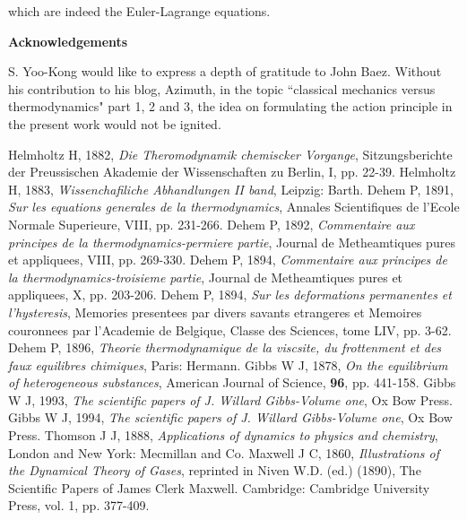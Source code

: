 \documentclass[12pt]{article}
\makeatletter
\numberwithin{equation}{section}
\newcommand\ackname{Acknowledgements}
\newenvironment{acknowledgements}{
	\titlepage
	\null\vfil
	\@beginparpenalty\@lowpenalty
	\begin{center}
		\bfseries \ackname
		\@endparpenalty\@M1
\end{center}}
{\par\vfil\null\endtitlepage}
\newenvironment{acknowledgements}{
	\if@twocolumn
	\section*{\abstractname}
	\else
	\small
	\begin{center}
		{\bfseries \ackname\vspace{-.5em}\vspace{\z@}}
	\end{center}
	\quotation
	\fi}
{\if@twocolumn\else\endquotation\fi}
\theoremstyle{remark}
\theoremstyle{definition}
\makeatother
\begin{document}
which are indeed the Euler-Lagrange equations.
\begin{acknowledgements}

S. Yoo-Kong would like to express a depth of gratitude to John Baez. Without his contribution to his blog, Azimuth, in the topic ``classical mechanics versus thermodynamics" part 1, 2 and 3, the idea on formulating the action principle in the present work would not be ignited.
\end{acknowledgements}
\begin{thebibliography}{}
Helmholtz H, 1882, 
\emph{Die Theromodynamik chemiscker Vorgange}, 
Sitzungsberichte der Preussischen Akademie der Wissenschaften zu Berlin, I, pp. 22-39.
%
Helmholtz H, 1883, 
\emph{Wissenchafiliche Abhandlungen II band}, Leipzig: Barth.
%
%
Dehem P, 1891, 
\emph{Sur les equations generales de la thermodynamics}, Annales Scientifiques de l'Ecole Normale Superieure, VIII, pp. 231-266.
%
%
Dehem P, 1892, 
\emph{Commentaire aux principes de la thermodynamics-permiere partie}, Journal de Metheamtiques pures et appliquees, VIII, pp. 269-330.
%
%
Dehem P, 1894, 
\emph{Commentaire aux principes de la thermodynamics-troisieme partie}, Journal de Metheamtiques pures et appliquees, X, pp. 203-206.
%
%
Dehem P, 1894, 
\emph{Sur les deformations permanentes et l'hysteresis}, Memories presentees par divers savants etrangeres et Memoires couronnees par l'Academie de Belgique, Classe des Sciences, tome LIV, pp. 3-62.
%
%
Dehem P, 1896, 
\emph{Theorie thermodynamique de la viscsite, du frottenment et des faux equilibres chimiques}, Paris: Hermann.
%
Gibbs W J, 1878, 
\emph{On the equilibrium of heterogeneous substances}, 
American Journal of Science, \textbf{96}, pp. 441-158.
%
Gibbs W J, 1993, 
\emph{The scientific papers of J. Willard Gibbs-Volume one}, Ox Bow Press.
%
%
Gibbs W J, 1994, 
\emph{The scientific papers of J. Willard Gibbs-Volume one}, Ox Bow Press.
%
%
Thomson J J, 1888, 
\emph{Applications of dynamics to physics and chemistry}, London and New York: Mecmillan and Co.
%
%
Maxwell J C, 1860, 
\emph{Illustrations of the Dynamical Theory of Gases}, reprinted in Niven W.D. (ed.) (1890), The Scientific Papers of James Clerk Maxwell. Cambridge: Cambridge University Press, vol. 1, pp. 377-409.

\end{thebibliography}
\end{document}
